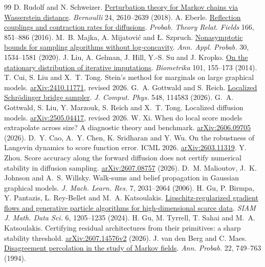 \documentclass[12pt,a4paper]{article}
\begin{document}
\begin{thebibliography}{99}
 D. Rudolf and N. Schweizer. \href{https://doi.org/10.3150/17-BEJ938}{Perturbation theory for Markov chains via Wasserstein distance}. \emph{Bernoulli} 24, 2610--2639 (2018).
 A. Eberle. \href{https://doi.org/10.1007/s00440-015-0673-1}{Reflection couplings and contraction rates for diffusions}. \emph{Probab. Theory Relat. Fields} 166, 851--886 (2016).
 M.~B. Majka, A. Mijatovi\'c and \L. Szpruch. \href{https://doi.org/10.1214/19-AAP1535}{Nonasymptotic bounds for sampling algorithms without log-concavity}. \emph{Ann. Appl. Probab.} 30, 1534--1581 (2020).
 J. Liu, A. Gelman, J. Hill, Y.-S. Su and J. Kropko. \href{https://doi.org/10.1093/biomet/ast044}{On the stationary distribution of iterative imputations}. \emph{Biometrika} 101, 155--173 (2014).
 T. Cui, S. Liu and X.~T. Tong. Stein's method for marginals on large graphical models. \href{https://arxiv.org/abs/2410.11771}{arXiv:2410.11771}, revised 2026.
 G.~A. Gottwald and S. Reich. \href{https://doi.org/10.1016/j.jcp.2025.114583}{Localized Schr\"odinger bridge sampler}. \emph{J. Comput. Phys.} 548, 114583 (2026).
 G.~A. Gottwald, S. Liu, Y. Marzouk, S. Reich and X.~T. Tong. Localized diffusion models. \href{https://arxiv.org/abs/2505.04417}{arXiv:2505.04417}, revised 2026.
 W. Xi. When do local score models extrapolate across size? A diagnostic theory and benchmark. \href{https://arxiv.org/abs/2606.09705}{arXiv:2606.09705} (2026).
 D.~Y. Cao, A.~Y. Chen, K. Sridharan and Y. Wu. On the robustness of Langevin dynamics to score function error. ICML 2026. \href{https://arxiv.org/abs/2603.11319}{arXiv:2603.11319}.
 Y. Zhou. Score accuracy along the forward diffusion does not certify numerical stability in diffusion sampling. \href{https://arxiv.org/abs/2607.08757}{arXiv:2607.08757} (2026).
 D.~M. Malioutov, J.~K. Johnson and A.~S. Willsky. Walk-sums and belief propagation in Gaussian graphical models. \emph{J. Mach. Learn. Res.} 7, 2031--2064 (2006).
 H. Gu, P. Birmpa, Y. Pantazis, L. Rey-Bellet and M.~A. Katsoulakis. \href{https://doi.org/10.1137/23M1587841}{Lipschitz-regularized gradient flows and generative particle algorithms for high-dimensional scarce data}. \emph{SIAM J. Math. Data Sci.} 6, 1205--1235 (2024).
 H. Gu, M. Tyrrell, T. Sahai and M.~A. Katsoulakis. Certifying residual architectures from their primitives: a sharp stability threshold. \href{https://arxiv.org/abs/2607.14576}{arXiv:2607.14576v2} (2026).
 J. van den Berg and C. Maes. \href{https://doi.org/10.1214/aop/1176988728}{Disagreement percolation in the study of Markov fields}. \emph{Ann. Probab.} 22, 749--763 (1994).
\end{thebibliography}
\endgroup
\end{document}

